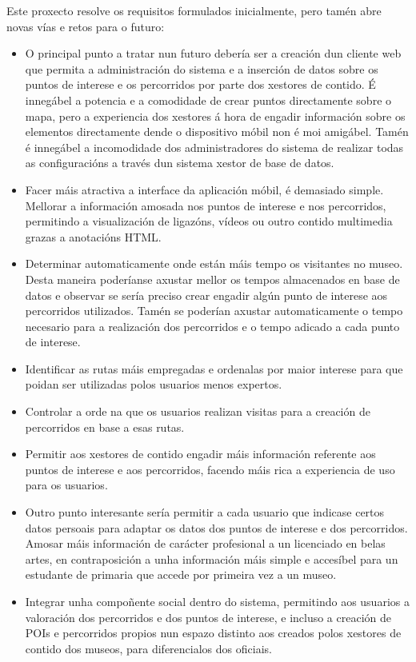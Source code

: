 Este proxecto resolve os requisitos formulados inicialmente, pero tamén abre novas vías e retos para o futuro:

\begin{itemize}
	\item O principal punto a tratar nun futuro debería ser a creación dun cliente web que permita a administración do sistema e a inserción de datos sobre os puntos de interese e os percorridos por parte dos xestores de contido. É innegábel a potencia e a comodidade de crear puntos directamente sobre o mapa, pero a experiencia dos xestores á hora de engadir información sobre os elementos directamente dende o dispositivo móbil non é moi amigábel. Tamén é innegábel a incomodidade dos administradores do sistema de realizar todas as configuracións a través dun sistema xestor de base de datos.
	\item Facer máis atractiva a interface da aplicación móbil, é demasiado simple. Mellorar a información amosada nos puntos de interese e nos percorridos, permitindo a visualización de ligazóns, vídeos ou outro contido multimedia grazas a anotacións HTML.
	\item Determinar automaticamente onde están máis tempo os visitantes no museo. Desta maneira poderíanse axustar mellor os tempos almacenados en base de datos e observar se sería preciso crear engadir algún punto de interese aos percorridos utilizados. Tamén se poderían axustar automaticamente o tempo necesario para a realización dos percorridos e o tempo adicado a cada punto de interese.
	\item Identificar as rutas máis empregadas e ordenalas por maior interese para que poidan ser utilizadas polos usuarios menos expertos.
	\item Controlar a orde na que os usuarios realizan visitas para a creación de percorridos en base a esas rutas.
	\item Permitir aos xestores de contido engadir máis información referente aos puntos de interese e aos percorridos, facendo máis rica a experiencia de uso para os usuarios.
	\item Outro punto interesante sería permitir a cada usuario que indicase certos datos persoais para adaptar os datos dos puntos de interese e dos percorridos. Amosar máis información de carácter profesional a un licenciado en belas artes, en contraposición a unha información máis simple e accesíbel para un estudante de primaria que accede por primeira vez a un museo.
	\item Integrar unha compoñente social dentro do sistema, permitindo aos usuarios a valoración dos percorridos e dos puntos de interese, e incluso a creación de POIs e percorridos propios nun espazo distinto aos creados polos xestores de contido dos museos, para diferencialos dos oficiais.
\end{itemize}
